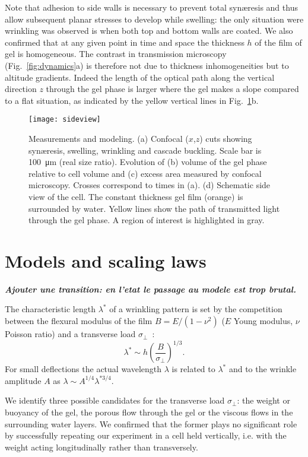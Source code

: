 \documentclass[twocolumn,superscriptaddress,showpacs,preprintnumbers,
amsmath,amssymb,prl]{revtex4-1}
\newcommand{\seb}[1]{\textbf{\color{blue}#1}} %
\begin{document}
Note that adhesion to side walls is necessary to prevent total syn\ae{}resis and thus allow subsequent planar stresses to develop while swelling: the only situation were wrinkling was observed is when both top and bottom walls are coated. We also confirmed that at any given point in time and space the thickness $h$ of the film of gel is homogeneous. The contrast in transmission microscopy (Fig.~\ref{fig:dynamics}a) is therefore not due to thickness inhomogeneities but to altitude gradients. Indeed the length of the optical path along the vertical direction $z$ through the gel phase is larger where the gel makes a slope compared to a flat situation, as indicated by the yellow vertical lines in Fig.~\ref{fig:sideview}b.

\begin{figure}
	\texttt{[image: sideview]}
	\caption{Measurements and modeling. (a) Confocal ($x$,$z$) cuts showing syn\ae{}resis, swelling, wrinkling and cascade buckling. Scale bar is \SI{100}{\micro\metre} (real size ratio). Evolution of (b) volume of the gel phase relative to cell volume and (c) excess area measured by confocal microscopy. Crosses correspond to times in (a). (d) Schematic side view of the cell. The constant thickness gel film (orange) is surrounded by water. Yellow lines show the path of transmitted light through the gel phase. A region of interest is highlighted in gray.}
	\label{fig:sideview}
\end{figure}

\section*{Models and scaling laws}

\seb{\it Ajouter une transition: en l'etat le passage au modele est trop brutal.}

The characteristic length $\lambda^*$ of a wrinkling pattern is set by the competition between the flexural modulus of the film $B=E/(1-\nu^2)$ ($E$ Young modulus, $\nu$ Poisson ratio) and a transverse load $\sigma_\perp$~\cite{Vella2009,Kolinski2009}: 
\begin{equation}
\lambda^* \sim h \left(\frac{B}{\sigma_\perp}\right)^{1/3}.
\label{eq:lstar}
\end{equation}
For small deflections the actual wavelength $\lambda$ is related to $\lambda^*$ and to the wrinkle amplitude $A$ as $\lambda \sim A^{1/4} \lambda^{*3/4}$.

We identify three possible candidates for the transverse load $\sigma_\perp$: the weight or buoyancy of the gel, the porous flow through the gel or the viscous flows in the surrounding water layers. We confirmed that the former plays no significant role by successfully repeating our experiment in a cell held vertically, i.e. with the weight acting longitudinally rather than transversely.
\end{document}
